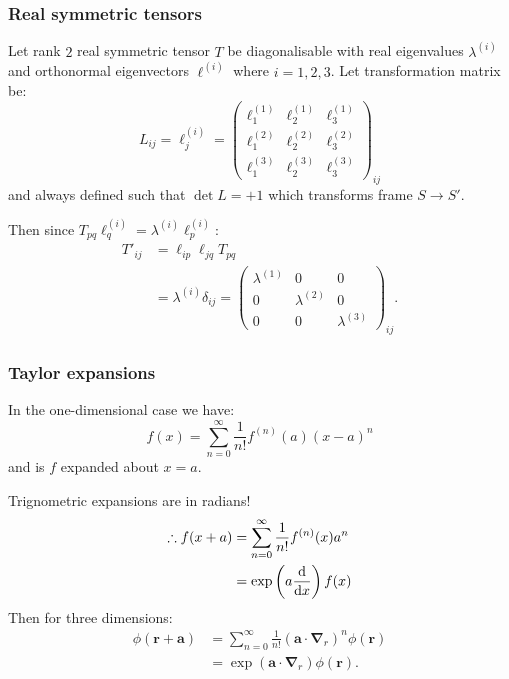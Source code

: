 \documentclass{article}
\newcommand{\vc}[1]{\boldsymbol{#1}}
\begin{document}
\begin{multicols*}{3}
\subsubsection*{Real symmetric tensors}
Let rank $2$ real symmetric tensor $T$
be diagonalisable with real eigenvalues
$\lambda^{(i)}$ and orthonormal eigenvectors
$\vc{\ell}^{(i)}$ where $i=1,2,3$.
Let transformation matrix be:
$$L_{ij}=\ell_j^{(i)}
=\begin{pmatrix}
    \ell_1^{(1)} & \ell_2^{(1)} & \ell_3^{(1)} \\
    \ell_1^{(2)} & \ell_2^{(2)} & \ell_3^{(2)} \\
    \ell_1^{(3)} & \ell_2^{(3)} & \ell_3^{(3)}
\end{pmatrix}_{ij}$$
and always defined such that $\det L=+1$
which transforms frame $S\rightarrow S'$.

Then since $T_{pq}\ell_q^{(i)}=\lambda^{(i)}\ell_p^{(i)}$:
\begin{align*}
    T'_{ij}
    &=\ell_{ip}\ell_{jq}T_{pq} \\
    &=\lambda^{(i)}\delta_{ij}
    =\begin{pmatrix}
        \lambda^{(1)} & 0 & 0 \\
        0 & \lambda^{(2)} & 0 \\
        0 & 0 & \lambda^{(3)}
    \end{pmatrix}_{ij}.
\end{align*}

\subsubsection*{Taylor expansions}
In the one-dimensional case we have:
$$f(x)=\sum_{n=0}^{\infty}
\frac{1}{n!}f^{(n)}(a)(x-a)^n$$
and is $f$ expanded about $x=a$.

Trignometric expansions are in radians!
\begin{align*}
    \therefore f(x+a)
    &=\sum_{n=0}^{\infty}\frac{1}{n!}
    f^{(n)}(x)a^n \\
    &=\exp\left(a\dv{x}\right)f(x)
\end{align*}
Then for three dimensions:
\begin{align*}
    \phi(\boldsymbol{r}+\boldsymbol{a})
    &=\sum_{n=0}^{\infty}\frac{1}{n!}
    (\boldsymbol{a}\cdot\boldsymbol{\nabla}_r)^n
    \phi(\boldsymbol{r}) \\
    &=\exp(\boldsymbol{a}\cdot
    \boldsymbol{\nabla}_r)\phi(\boldsymbol{r}).
\end{align*}


\end{multicols*}
\end{document}
